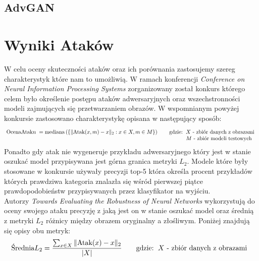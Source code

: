 \documentclass[
    left=2.5cm,         %
    right=2.5cm,        %
    top=2.5cm,          %
    bottom=3cm,         %
    bindingoffset=6mm,  %
    nohyphenation=false %
]{eiti/eiti-thesis}
\begin{document}
\subsection{AdvGAN}

\section{Wyniki Ataków}
    W celu oceny skuteczności ataków oraz ich porównania zastosujemy szereg charakterystyk które nam to umożliwią.
    W ramach konferencji
    \textit{Conference on Neural Information Processing Systems} zorganizowany został konkurs którego celem było
    określenie postępu ataków adwersaryjnych oraz wszechstronności modeli zajmujących się przetwarzaniem obrazów\cite{DBLP:journals/corr/abs-1808-01976}.
    W wspomnianym powyżej konkursie zastosowano charakterystykę opisana w następujący sposób:
    \begin{equation}\label{nips_median}
        \text { OcenaAtaku }=\operatorname{mediana}\left(\left\{\|\text{Atak}{(x, m)}-x\|_2 : x \in X, m \in M\right\}\right)
        \qquad\text{gdzie:}
        \begin{tabular}[t]{ll}
        \(X\) - zbiór danych z obrazami \\
        \(M\) - zbiór modeli testowych\\
        \end{tabular}
    \end{equation}
    Ponadto gdy atak nie wygeneruje przykładu adwersaryjnego który jest w stanie oszukać model przypisywana jest górna granica
    metryki \(L_2\).
    Modele które były stosowane w konkursie używały precyzji top-5 która określa procent przykładów których prawdziwa
    kategoria znalazła się wśród pierwszej piątce prawdopodobieństw przypisywanych przez klasyfikator na wyjściu.\\

    Autorzy \textit{Towards Evaluating the Robustness of Neural Networks}\cite{DBLP:journals/corr/CarliniW16a} wykorzystują do oceny swojego ataku precyzję z jaką jest on w stanie oszukać
    model oraz średnią z metryki \(L_2\) różnicy między obrazem oryginalny a złośliwym. Poniżej znajdują się opisy obu metryk:
    \begin{equation}
        \text{Średnia\(L_2\)}=\frac{\sum_{x \in X}\|\text{Atak}(x)-x\|_2}{|X|}
        \qquad\text{gdzie:}
        \begin{tabular}[t]{ll}
        \(X\) - zbiór danych z obrazami \\
        \end{tabular}
    \end{equation}
\end{document}
